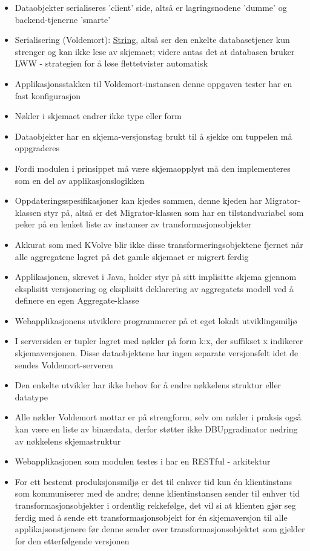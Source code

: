 \begin{itemize}
  \item Dataobjekter serialiseres 'client' side, altså er lagringsnodene 'dumme' og backend-tjenerne 'smarte'
  \item Serialisering (Voldemort): \underline{String}, altså ser den enkelte databasetjener kun strenger og kan ikke lese av skjemaet; videre antas det at databasen bruker LWW - strategien for å løse flettetvister automatisk
  \item Applikasjonsstakken til Voldemort-instansen denne oppgaven tester har en fast konfigurasjon
  \item Nøkler i skjemaet endrer ikke type eller form
  \item Dataobjekter har en skjema-versjonstag brukt til å sjekke om tuppelen må oppgraderes
  \item Fordi modulen i prinsippet må være skjemaopplyst må den implementeres som en del av applikasjonslogikken
  \item Oppdateringsspesifikasjoner kan kjedes sammen, denne kjeden har Migrator-klassen styr på, altså er det Migrator-klassen som har en tilstandvariabel som peker på en lenket liste av instanser av transformasjonsobjekter
  \item Akkurat som med KVolve blir ikke disse transformeringsobjektene fjernet når alle aggregatene lagret på det gamle skjemaet er migrert ferdig
  \item Applikasjonen, skrevet i Java, holder styr på sitt implisitte skjema gjennom eksplisitt versjonering og eksplisitt deklarering av aggregatets modell ved å definere en egen Aggregate-klasse
  \item Webapplikasjonens utviklere programmerer på et eget lokalt utviklingsmiljø
  \item I serversiden er tupler lagret med nøkler på form k:x, der suffikset x indikerer skjemaversjonen. Disse dataobjektene har ingen separate versjonsfelt idet de sendes Voldemort-serveren
  \item Den enkelte utvikler har ikke behov for å endre nøkkelens struktur eller datatype
  \item Alle nøkler Voldemort mottar er på strengform, selv om nøkler i praksis også kan være en liste av binærdata, derfor støtter ikke DBUpgradinator nedring av nøkkelens skjemastruktur
  \item Webapplikasjonen som modulen testes i har en RESTful - arkitektur
  \item For ett bestemt produksjonsmiljø er det til enhver tid kun én klientinstans som kommuniserer med de andre; denne klientinstansen sender til enhver tid transformasjonsobjekter i ordentlig rekkefølge, det vil si at klienten gjør seg ferdig med å sende ett transformasjonsobjekt for én skjemaversjon til alle applikajsonstjenere før denne sender over transformasjonsobjektet som gjelder for den etterfølgende versjonen

\end{itemize}
